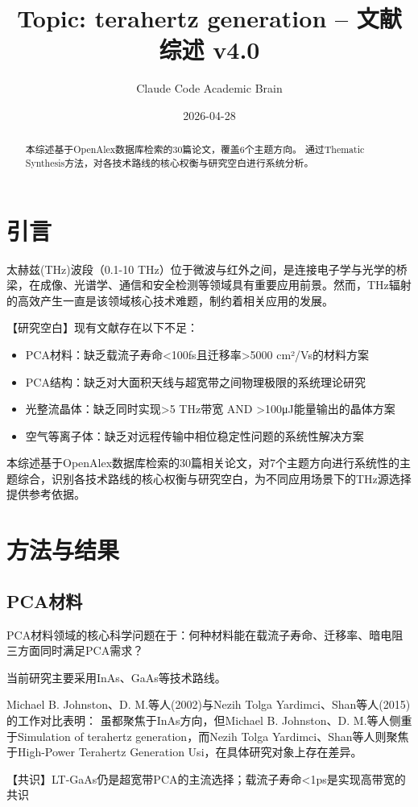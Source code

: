\documentclass[reprint,amsmath,amssymb,aps,floatfix]{revtex4-2}
\begin{document}
\title{Topic: terahertz generation -- 文献综述 v4.0}
\author{Claude Code Academic Brain}
%
\date{2026-04-28}%
\begin{abstract}
本综述基于OpenAlex数据库检索的30篇论文，覆盖6个主题方向。
通过Thematic Synthesis方法，对各技术路线的核心权衡与研究空白进行系统分析。
\end{abstract}
\maketitle
\section{引言}
\par\par{太赫兹(THz)波段（0.1-10 THz）位于微波与红外之间，是连接电子学与光学的桥梁，在成像、光谱学、通信和安全检测等领域具有重要应用前景。然而，THz辐射的高效产生一直是该领域核心技术难题，制约着相关应用的发展。}
\par\par{【研究空白】现有文献存在以下不足：}
\begin{itemize}
\item PCA材料：缺乏载流子寿命<100fs且迁移率>5000 cm²/Vs的材料方案
\item PCA结构：缺乏对大面积天线与超宽带之间物理极限的系统理论研究
\item 光整流晶体：缺乏同时实现>5 THz带宽 AND >100μJ能量输出的晶体方案
\item 空气等离子体：缺乏对远程传输中相位稳定性问题的系统性解决方案
\end{itemize}
\par\par{本综述基于OpenAlex数据库检索的30篇相关论文，对7个主题方向进行系统性的主题综合，识别各技术路线的核心权衡与研究空白，为不同应用场景下的THz源选择提供参考依据。}
\section{方法与结果}
\subsection{PCA材料}
\par\par{PCA材料领域的核心科学问题在于：何种材料能在载流子寿命、迁移率、暗电阻三方面同时满足PCA需求？}

\par\par{当前研究主要采用InAs、GaAs等技术路线。}
\par\par{Michael B. Johnston、D. M.等人(2002)与Nezih Tolga Yardimci、Shan等人(2015)的工作对比表明：}
虽都聚焦于InAs方向，但Michael B. Johnston、D. M.等人侧重于Simulation of terahertz generation，而Nezih Tolga Yardimci、Shan等人则聚焦于High-Power Terahertz Generation Usi，在具体研究对象上存在差异。
\par\par{【共识】LT-GaAs仍是超宽带PCA的主流选择；载流子寿命<1ps是实现高带宽的共识}
\end{document}
